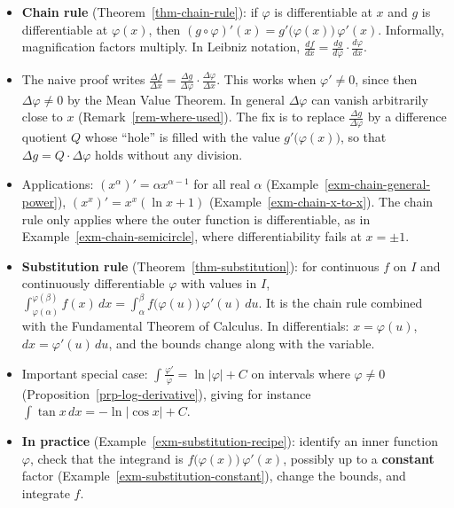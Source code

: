 \documentclass[
  letterpaper,
  DIV=11,
  numbers=noendperiod]{scrreprt}
\providecommand{\tightlist}{%
  \setlength{\itemsep}{0pt}\setlength{\parskip}{0pt}}
\theoremstyle{plain}
\theoremstyle{plain}
\theoremstyle{definition}
\theoremstyle{definition}
\theoremstyle{definition}
\theoremstyle{plain}
\theoremstyle{plain}
\theoremstyle{remark}
\begin{document}
\begin{itemize}
\tightlist
\item
  \textbf{Chain rule} (Theorem~\ref{thm-chain-rule}): if \(\varphi\) is
  differentiable at \(x\) and \(g\) is differentiable at \(\varphi(x)\),
  then \((g\circ\varphi)'(x) = g'\big(\varphi(x)\big)\,\varphi'(x)\).
  Informally, magnification factors multiply. In Leibniz notation,
  \(\frac{df}{dx}=\frac{dg}{d\varphi}\cdot\frac{d\varphi}{dx}\).
\item
  The naive proof writes
  \(\frac{\Delta f}{\Delta x} = \frac{\Delta g}{\Delta\varphi}\cdot\frac{\Delta\varphi}{\Delta x}\).
  This works when \(\varphi'\neq0\), since then \(\Delta\varphi\neq0\)
  by the Mean Value Theorem. In general \(\Delta\varphi\) can vanish
  arbitrarily close to \(x\) (Remark~\ref{rem-where-used}). The fix is
  to replace \(\frac{\Delta g}{\Delta\varphi}\) by a difference quotient
  \(Q\) whose ``hole'' is filled with the value
  \(g'\big(\varphi(x)\big)\), so that \(\Delta g = Q\cdot\Delta\varphi\)
  holds without any division.
\item
  Applications: \((x^\alpha)' = \alpha x^{\alpha-1}\) for all real
  \(\alpha\) (Example~\ref{exm-chain-general-power}),
  \((x^x)' = x^x(\ln x+1)\) (Example~\ref{exm-chain-x-to-x}). The chain
  rule only applies where the outer function is differentiable, as in
  Example~\ref{exm-chain-semicircle}, where differentiability fails at
  \(x=\pm1\).
\item
  \textbf{Substitution rule} (Theorem~\ref{thm-substitution}): for
  continuous \(f\) on \(I\) and continuously differentiable \(\varphi\)
  with values in \(I\),
  \(\int_{\varphi(\alpha)}^{\varphi(\beta)}f(x)\,dx = \int_\alpha^\beta f\big(\varphi(u)\big)\,\varphi'(u)\,du\).
  It is the chain rule combined with the Fundamental Theorem of
  Calculus. In differentials: \(x=\varphi(u)\), \(dx=\varphi'(u)\,du\),
  and the bounds change along with the variable.
\item
  Important special case:
  \(\int\frac{\varphi'}{\varphi} = \ln\lvert \varphi \rvert+C\) on
  intervals where \(\varphi\neq0\)
  (Proposition~\ref{prp-log-derivative}), giving for instance
  \(\int\tan x\,dx = -\ln\lvert \cos x \rvert+C\).
\item
  \textbf{In practice} (Example~\ref{exm-substitution-recipe}): identify
  an inner function \(\varphi\), check that the integrand is
  \(f\big(\varphi(x)\big)\,\varphi'(x)\), possibly up to a
  \textbf{constant} factor (Example~\ref{exm-substitution-constant}),
  change the bounds, and integrate \(f\).
\end{itemize}
\end{document}
